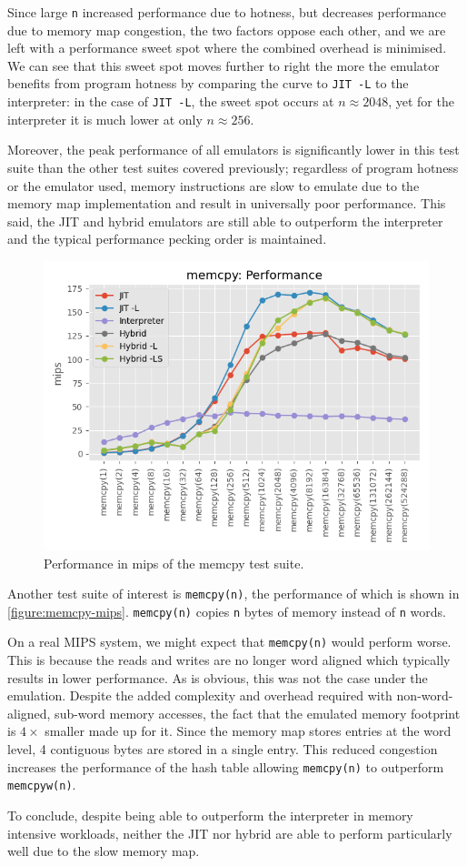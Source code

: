 Since large \texttt{n} increased performance due to hotness, but decreases performance due to memory map congestion, the two factors oppose each other, and we are left with a performance sweet spot where the combined overhead is minimised. We can see that this sweet spot moves further to right the more the emulator benefits from program hotness by comparing the curve to \texttt{JIT -L} to the interpreter: in the case of \texttt{JIT -L}, the sweet spot occurs at $n\approx2048$, yet for the interpreter it is much lower at only $n\approx256$.

Moreover, the peak performance of all emulators is significantly lower in this test suite than the other test suites covered previously; regardless of program hotness or the emulator used, memory instructions are slow to emulate due to the memory map implementation and result in universally poor performance. This said, the JIT and hybrid emulators are still able to outperform the interpreter and the typical performance pecking order is maintained.

\begin{figure}[H]
    \centering
    \includegraphics[scale=0.75]{output/graphs/tests/all/memcpy/mips.png}
    \caption{Performance in mips of the memcpy test suite.}
    \label{figure:memcpy-mips}
\end{figure}

Another test suite of interest is \texttt{memcpy(n)}, the performance of which is shown in \autoref{figure:memcpy-mips}. \texttt{memcpy(n)} copies \texttt{n} bytes of memory instead of \texttt{n} words.

On a real MIPS system, we might expect that \texttt{memcpy(n)} would perform worse. This is because the reads and writes are no longer word aligned which typically results in lower performance. As is obvious, this was not the case under the emulation. Despite the added complexity and overhead required with non-word-aligned, sub-word memory accesses, the fact that the emulated memory footprint is $4\times$ smaller made up for it. Since the memory map stores entries at the word level, 4 contiguous bytes are stored in a single entry. This reduced congestion increases the performance of the hash table allowing \texttt{memcpy(n)} to outperform \texttt{memcpyw(n)}.

To conclude, despite being able to outperform the interpreter in memory intensive workloads, neither the JIT nor hybrid are able to perform particularly well due to the slow memory map.